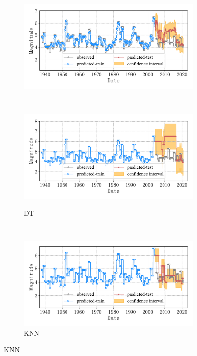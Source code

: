 \begin{figure}[!htbp]
\begin{subfigure}[b]{0.45\textwidth}
    \includegraphics[width=\textwidth]{Img/chap5_seism/block2/seism_gbr_minyear_1932_maxyear_2021_spanlat_2_spanlon_4_timewindow_72_nextmonth_12_minmag_3.0_block_2.pdf}
    \vspace{-1cm}
    \label{fig:seism_gbr_minyear_1932_maxyear_2021_spanlat_2_spanlon_4_timewindow_72_nextmonth_12_minmag_3.0_block_2}
  \end{subfigure}
  ~
  \begin{subfigure}[b]{0.45\textwidth}
    \caption{DT}
    \vspace{-0.2cm}
    \includegraphics[width=\textwidth]{Img/chap5_seism/block2/seism_dt_minyear_1932_maxyear_2021_spanlat_2_spanlon_4_timewindow_72_nextmonth_12_minmag_3.0_block_2.pdf}
    \vspace{-1cm}
    \label{fig:seism_dt_minyear_1932_maxyear_2021_spanlat_2_spanlon_4_timewindow_72_nextmonth_12_minmag_3.0_block_2}
  \end{subfigure}
  \\
  \begin{subfigure}[b]{0.45\textwidth}
    \caption{KNN}
    \vspace{-0.2cm}
    \includegraphics[width=\textwidth]{Img/chap5_seism/block2/seism_kn_minyear_1932_maxyear_2021_spanlat_2_spanlon_4_timewindow_72_nextmonth_12_minmag_3.0_block_2.pdf}

\end{subfigure}
\end{figure}
